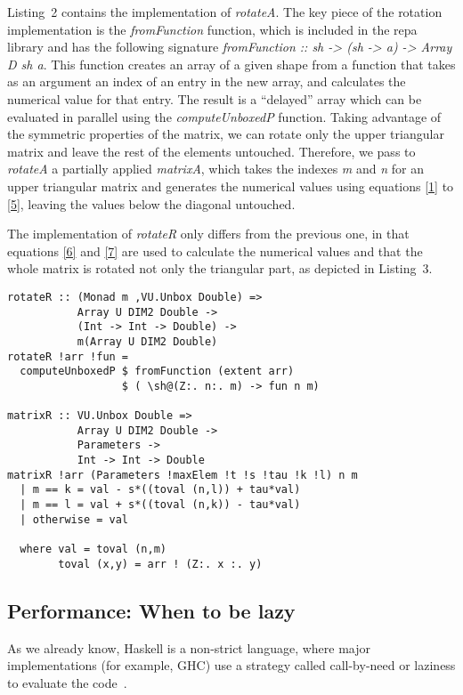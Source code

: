 \documentclass{tmr}
\begin{document}
Listing~2 contains the implementation of \textit{rotateA}.
%
The key piece of the rotation implementation is the
\textit{fromFunction} function, which is included in the repa library
and has the following signature 
\textit{fromFunction :: sh -> (sh -> a) -> Array D sh a}.
%
This function creates an array of a given shape from a function that
takes as an argument an index of an entry in the new array, and
calculates the numerical value for that entry.
%
The result is a ``delayed'' array which can be evaluated in parallel
using the \textit{computeUnboxedP} function.
%
Taking advantage of the symmetric properties of the matrix, we can
rotate only the upper triangular matrix and leave the rest of the elements untouched.
%
Therefore, we pass to \textit{rotateA} a partially applied
\textit{matrixA}, which takes the indexes \textit{m} and \textit{n} for
an upper triangular matrix and generates the numerical values using
equations \eqref{1} to \eqref{5}, leaving the values below the diagonal
untouched.

The implementation of \textit{rotateR} only differs from the previous
one, in that equations \eqref{6} and \eqref{7} are used to calculate the
numerical values and that the whole matrix is rotated not only the
triangular part, as depicted in Listing~3.

\begin{lstlisting}[float,captionpos=b,belowcaptionskip=4pt, caption= rotateR function]
rotateR :: (Monad m ,VU.Unbox Double) =>
           Array U DIM2 Double ->
           (Int -> Int -> Double) ->
           m(Array U DIM2 Double)
rotateR !arr !fun =
  computeUnboxedP $ fromFunction (extent arr)
                  $ ( \sh@(Z:. n:. m) -> fun n m)
        
matrixR :: VU.Unbox Double =>
           Array U DIM2 Double ->
           Parameters ->
           Int -> Int -> Double
matrixR !arr (Parameters !maxElem !t !s !tau !k !l) n m
  | m == k = val - s*((toval (n,l)) + tau*val)
  | m == l = val + s*((toval (n,k)) - tau*val)
  | otherwise = val

  where val = toval (n,m)
        toval (x,y) = arr ! (Z:. x :. y)
\end{lstlisting}

\subsection{Performance: When to be lazy}

As we already know, Haskell is a non-strict language, where major
implementations (for example, GHC) use a strategy called call-by-need or
laziness to evaluate the code~\cite{Laziness}.
\end{document}
